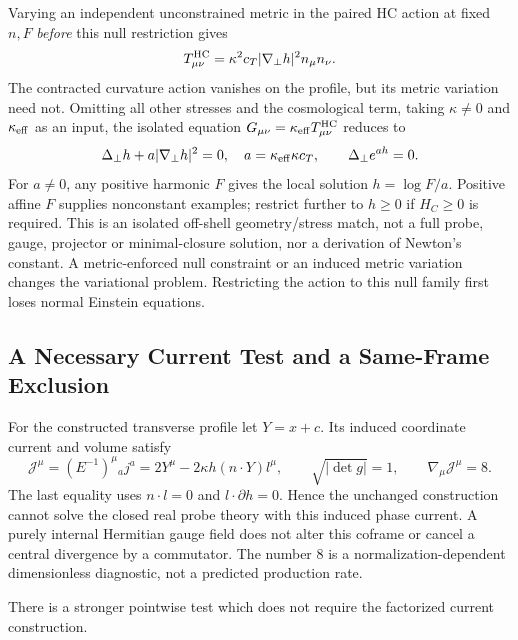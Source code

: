 Varying an independent unconstrained metric in the paired HC action
at fixed $n,F$ \emph{before} this null restriction gives
\[
 T^{\rm HC}_{\mu\nu}=\kappa^2c_T|\nabla_\perp h|^2n_\mu n_\nu.
\]
The contracted curvature action vanishes on the profile, but its metric
variation need not. Omitting all other stresses and the cosmological
term, taking $\kappa\ne0$ and $\kappa_{\rm eff}$ as an input, the isolated equation
$G_{\mu\nu}=\kappa_{\rm eff}T^{\rm HC}_{\mu\nu}$ reduces to
\[
 \Delta_\perp h+a|\nabla_\perp h|^2=0,\quad
 a=\kappa_{\rm eff}\kappa c_T,\qquad
 \Delta_\perp e^{ah}=0.
\]
For $a\ne0$, any positive harmonic $F$ gives the local solution
$h=\log F/a$. Positive affine $F$ supplies nonconstant examples;
restrict further to $h\geq0$ if $H_C\geq0$ is required.
This is an isolated off-shell geometry/stress match, not a full probe,
gauge, projector or minimal-closure solution, nor a derivation of
Newton's constant. A metric-enforced null constraint or an induced
metric variation changes the variational problem. Restricting the
action to this null family first loses normal Einstein equations.

\subsection{A Necessary Current Test and a Same-Frame Exclusion}

For the constructed transverse profile let $Y=x+c$. Its induced
coordinate current and volume satisfy
\[
 \mathcal J^\mu=(E^{-1})^\mu{}_a j^a
       =2Y^\mu-2\kappa h(n\mathbin{\cdot}Y)l^\mu,
 \qquad \sqrt{|\det g|}=1,\qquad
 \nabla_\mu\mathcal J^\mu=8.
\]
The last equality uses $n\mathbin{\cdot}l=0$ and
$l\mathbin{\cdot}\partial h=0$. Hence the unchanged construction
cannot solve the closed real probe theory with this induced phase
current. A purely internal Hermitian gauge field does not alter this
coframe or cancel a central divergence by a commutator. The number
$8$ is a normalization-dependent dimensionless diagnostic, not a
predicted production rate.

There is a stronger pointwise test which does not require the
factorized current construction.

